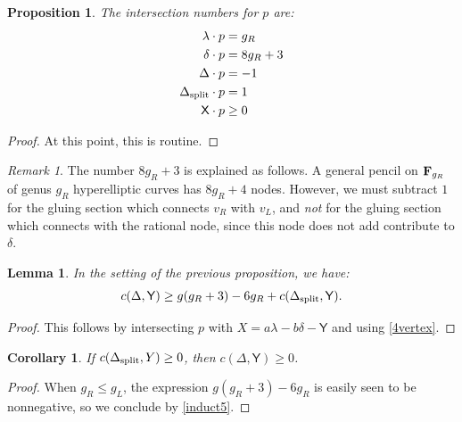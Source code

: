 \documentclass[reqno, 10 pt]{article}
\newtheorem{lem}[thm]{Lemma}
\newtheorem{prop}[thm]{Proposition}
\newtheorem{cor}[thm]{Corollary}
\theoremstyle{definition}
\theoremstyle{remark}
\newtheorem{rmk}[thm]{Remark}
\numberwithin{equation}{section}
\numberwithin{thm}{section}
\numberwithin{prop}{section}
\numberwithin{lem}{section}
\numberwithin{cor}{section}
\numberwithin{conj}{section}
\numberwithin{defn}{section}
\newcommand{\F}{{\mathbf F}}
\newcommand{\sfY}{{\mathsf Y}}
\newcommand{\sfX}{{\mathsf X}}
\renewcommand{\F}{{\bf F}}
\newcommand {\spl}{{\rm split}}
\begin{document}
\begin{prop}\label{4vertex}
The intersection numbers for $p$ are: 
 \begin{align*}
\lambda \cdot p &= g_R\\
\delta \cdot p &= 8g_R +3\\
\Delta \cdot p &= -1\\
\Delta_{\spl} \cdot p &= 1\\
{\sfX} \cdot p &\geq 0
\end{align*}

\end{prop}

\begin{proof}
At this point, this is routine.
\end{proof}

\begin{rmk}
The number $8g_{R}+3$ is explained as follows.  A general pencil on $\F_{g_{R}}$ of genus $g_{R}$ hyperelliptic curves has $8g_{R}+4$ nodes.  However, we must subtract $1$ for the gluing section which connects $v_{R}$ with $v_{L}$, and {\sl not} for the gluing section which connects with the rational node, since this node does not add contribute to $\delta$.
\end{rmk}

\begin{lem}
In the setting of the previous proposition, we have:  
\begin{equation}
 c(\Delta,{\sfY}) \geq g(g_R+3)-6g_R + c(\Delta_{\spl}, {\sfY}).
\end{equation}
\end{lem}

\begin{proof}
This follows by intersecting $p$ with $X = a\lambda - b\delta - \sfY$ and using \autoref{4vertex}.
\end{proof}

\begin{cor}\label{induct5}
If $c(\Delta_{\spl},Y) \geq 0$, then $c(\Delta, \sfY) \geq 0$.
\end{cor}

\begin{proof}
When $g_{R} \leq g_{L}$, the expression  $g(g_R+3)-6g_R$ is easily seen to be nonnegative, so we conclude by \autoref{induct5}.
\end{proof}
\end{document}
